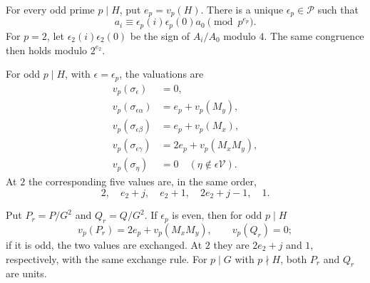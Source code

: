 \begin{theorem}
\label{thm:pat-valuations}
For every odd prime $p\mid H$, put $e_p=v_p(H)$.  There is a
unique $\epsilon_p\in\mathcal P$ such that
\[
 a_i\equiv\epsilon_p(i)\epsilon_p(0)a_0\pmod {p^{e_p}}.
\]
For $p=2$, let $\epsilon_2(i)\epsilon_2(0)$ be the sign of
$A_i/A_0$ modulo $4$.  The same congruence then holds modulo
$2^{e_2}$.

For odd $p\mid H$, with $\epsilon=\epsilon_p$, the valuations are
\begin{equation}
\begin{aligned}
 v_p(\sigma_\epsilon)&=0,\\
 v_p(\sigma_{\epsilon\alpha})&=e_p+v_p(M_y),\\
 v_p(\sigma_{\epsilon\beta})&=e_p+v_p(M_x),\\
 v_p(\sigma_{\epsilon\gamma})&=2e_p+v_p(M_xM_y),\\
 v_p(\sigma_\eta)&=0\quad(\eta\notin\epsilon\mathcal V).
\end{aligned}
\label{eq:pat-odd-table}
\end{equation}
At $2$ the corresponding five values are, in the same order,
\begin{equation}
 2,\quad e_2+j,\quad e_2+1,\quad 2e_2+j-1,\quad 1.
 \label{eq:pat-two-table}
\end{equation}

Put $P_r=P/G^2$ and $Q_r=Q/G^2$.  If $\epsilon_p$ is even,
then for odd $p\mid H$
\[
 v_p(P_r)=2e_p+v_p(M_xM_y),\qquad v_p(Q_r)=0;
\]
if it is odd, the two values are exchanged.  At $2$ they are
$2e_2+j$ and $1$, respectively, with the same exchange rule.
For $p\mid G$ with $p\nmid H$, both $P_r$ and $Q_r$ are units.
\end{theorem}

